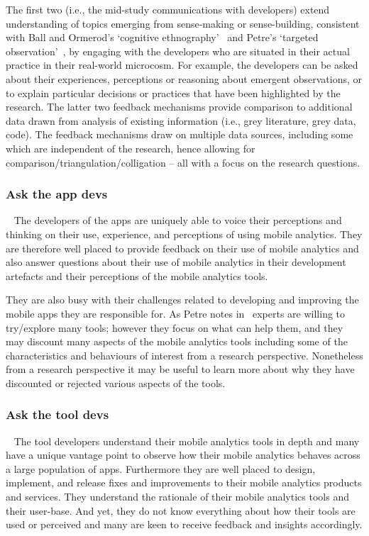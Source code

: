 The first two (i.e., the mid-study communications with developers) extend understanding of topics emerging from sense-making or sense-building, consistent with Ball and Ormerod's `cognitive ethnography'~ and Petre's `targeted observation'~, by engaging with the developers who are situated in their actual practice in their real-world microcosm.  For example, the developers can be asked about their experiences, perceptions or reasoning about emergent observations, or to explain particular decisions or practices that have been highlighted by the research. The latter two feedback mechanisms provide comparison to additional data drawn from analysis of existing information (i.e., grey literature, grey data, code).  The feedback mechanisms draw on multiple data sources, including some which are independent of the research, hence allowing for comparison/triangulation/colligation -- all with a focus on the research questions.

\subsubsection{Ask the app devs}~\label{section-ask-the-app-devs-research-method}
The developers of the apps are uniquely able to voice their perceptions and thinking on their use, experience, and perceptions of using mobile analytics. They are therefore well placed to provide feedback on their use of mobile analytics and also answer questions about their use of mobile analytics in their development artefacts and their perceptions of the mobile analytics tools.

They are also busy with their challenges related to developing and improving the mobile apps they are responsible for. As Petre notes in~ experts are willing to try/explore many tools; however they focus on what can help them, and they may discount many aspects of the mobile analytics tools including some of the characteristics and behaviours of interest from a research perspective. Nonetheless from a research perspective it may be useful to learn more about why they have discounted or rejected various aspects of the tools. 

\subsubsection{Ask the tool devs}~\label{section-ask-the-tool-devs-research-method}
The tool developers understand their mobile analytics tools in depth and many have a unique vantage point to observe how their mobile analytics behaves across a large population of apps. Furthermore they are well placed to design, implement, and release fixes and improvements to their mobile analytics products and services. They understand the rationale of their mobile analytics tools and their user-base. And yet, they do not know everything about how their tools are used or perceived and many are keen to receive feedback and insights accordingly.

